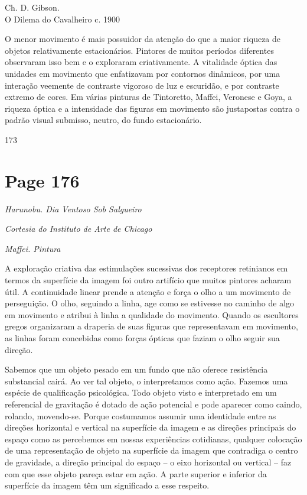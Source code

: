 \documentclass[a4paper]{article}
\begin{document}
\noindent Ch. D. Gibson. \\
O Dilema do Cavalheiro c. 1900

O menor movimento é mais possuidor da atenção do que a maior riqueza de objetos relativamente estacionários. Pintores de muitos períodos diferentes observaram isso bem e o exploraram criativamente. A vitalidade óptica das unidades em movimento que enfatizavam por contornos dinâmicos, por uma interação veemente de contraste vigoroso de luz e escuridão, e por contraste extremo de cores. Em várias pinturas de Tintoretto, Maffei, Veronese e Goya, a riqueza óptica e a intensidade das figuras em movimento são justapostas contra o padrão visual submisso, neutro, do fundo estacionário.

173

\newpage
\section*{Page 176}

\begin{flushleft}
\textit{Harunobu. Dia Ventoso Sob Salgueiro}
\end{flushleft}
\begin{flushleft}
\textit{Cortesia do Instituto de Arte de Chicago}
\end{flushleft}

\vspace{5.5cm} %

\begin{flushleft}
\textit{Maffei. Pintura}
\end{flushleft}

\vspace{5.5cm} %

A exploração criativa das estimulações sucessivas dos receptores
retinianos em termos da superfície da imagem foi outro artifício que
muitos pintores acharam útil. A continuidade linear prende a atenção e
força o olho a um movimento de perseguição. O olho, seguindo a linha,
age como se estivesse no caminho de algo em movimento e atribui à linha
a qualidade do movimento. Quando os escultores gregos organizaram a
draperia de suas figuras que representavam em movimento, as linhas
foram concebidas como forças ópticas que faziam o olho seguir sua
direção.

Sabemos que um objeto pesado em um fundo que não oferece
resistência substancial cairá. Ao ver tal objeto, o interpretamos como
ação. Fazemos uma espécie de qualificação psicológica. Todo objeto
visto e interpretado em um referencial de gravitação é dotado de ação
potencial e pode aparecer como caindo, rolando, movendo-se. Porque
costumamos assumir uma identidade entre as direções horizontal e
vertical na superfície da imagem e as direções principais do espaço
como as percebemos em nossas experiências cotidianas, qualquer
colocação de uma representação de objeto na superfície da imagem que
contradiga o centro de gravidade, a direção principal do espaço – o eixo
horizontal ou vertical – faz com que esse objeto pareça estar em ação.
A parte superior e inferior da superfície da imagem têm um
significado a esse respeito.
\end{document}
